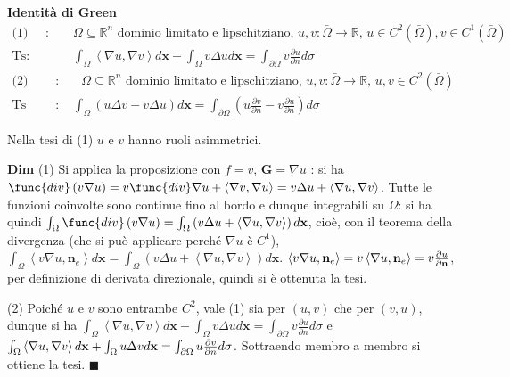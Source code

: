 \documentclass{article}
\begin{document}
\textbf{Identit\`{a} di Green}%
\begin{eqnarray*}
\text{(1) Hp}\text{: } &&\Omega \subseteq 
\mathbb{R}
^{n}\text{ dominio limitato e lipschitziano, }u,v:\bar{\Omega}\rightarrow 
\mathbb{R}
\text{, }u\in C^{2}\left( \bar{\Omega}\right) ,v\in C^{1}\left( \bar{\Omega}%
\right) \\
\text{Ts}\text{: } &&\int_{\Omega }\left\langle \nabla u,\nabla
v\right\rangle d\mathbf{x}+\int_{\Omega }v\Delta ud\mathbf{x}=\int_{\partial
\Omega }v\frac{\partial u}{\partial n}d\sigma \\
\text{(2) Hp} &\text{:}&\text{ }\Omega \subseteq 
\mathbb{R}
^{n}\text{ dominio limitato e lipschitziano, }u,v:\bar{\Omega}\rightarrow 
\mathbb{R}
\text{, }u,v\in C^{2}\left( \bar{\Omega}\right) \\
\text{Ts} &\text{: }&\int_{\Omega }\left( u\Delta v-v\Delta u\right) d%
\mathbf{x}=\int_{\partial \Omega }\left( u\frac{\partial v}{\partial n}-v%
\frac{\partial u}{\partial n}\right) d\sigma
\end{eqnarray*}

Nella tesi di (1) $u$ e $v$ hanno ruoli asimmetrici.

\textbf{Dim} (1) Si applica la proposizione con $f=v$, $\mathbf{G}=\nabla u$%
: si ha $\func{div}\left( v\nabla u\right) =v\func{div}\nabla u+\left\langle
\nabla v,\nabla u\right\rangle =v\Delta u+\left\langle \nabla u,\nabla
v\right\rangle $. Tutte le funzioni coinvolte sono continue fino al bordo e
dunque integrabili su $\Omega $: si ha quindi $\int_{\Omega }\func{div}%
\left( v\nabla u\right) =\int_{\Omega }\left( v\Delta u+\left\langle \nabla
u,\nabla v\right\rangle \right) d\mathbf{x}$, cio\`{e}, con il teorema della
divergenza (che si pu\`{o} applicare perch\'{e} $\nabla u$ \`{e} $C^{1}$), $%
\int_{\Omega }\left\langle v\nabla u,\mathbf{n}_{e}\right\rangle d\mathbf{x}%
=\int_{\Omega }\left( v\Delta u+\left\langle \nabla u,\nabla v\right\rangle
\right) d\mathbf{x}$. $\left\langle v\nabla u,\mathbf{n}_{e}\right\rangle
=v\left\langle \nabla u,\mathbf{n}_{e}\right\rangle =v\frac{\partial u}{%
\partial \mathbf{n}}$, per definizione di derivata direzionale, quindi si 
\`{e} ottenuta la tesi.

(2) Poich\'{e} $u$ e $v$ sono entrambe $C^{2}$, vale (1) sia per $\left(
u,v\right) $ che per $\left( v,u\right) $, dunque si ha $\int_{\Omega
}\left\langle \nabla u,\nabla v\right\rangle d\mathbf{x}+\int_{\Omega
}v\Delta ud\mathbf{x}=\int_{\partial \Omega }v\frac{\partial u}{\partial n}%
d\sigma $ e $\int_{\Omega }\left\langle \nabla u,\nabla v\right\rangle d%
\mathbf{x}+\int_{\Omega }u\Delta vd\mathbf{x}=\int_{\partial \Omega }u\frac{%
\partial v}{\partial n}d\sigma $. Sottraendo membro a membro si ottiene la
tesi. $\blacksquare $
\end{document}
